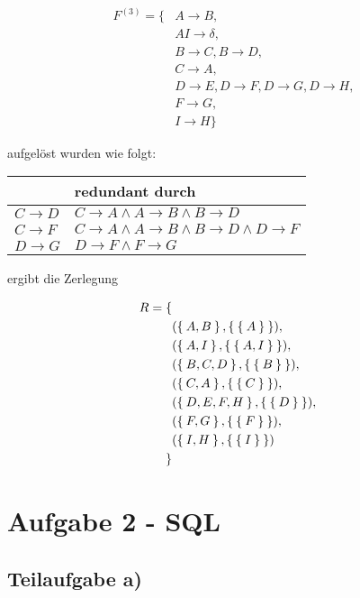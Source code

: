 \documentclass[a4paper,9pt]{scrartcl}
\begin{document}
\begin{align*}
F^{(3)} = \{  & A \rightarrow B,\\
    &AI \rightarrow \delta,\\
    & B \rightarrow C, B \rightarrow D,\\
    & C \rightarrow A,\\
    & D \rightarrow E,D \rightarrow F,D \rightarrow G,D \rightarrow H,\\
    & F \rightarrow G,\\
    & I \rightarrow H 
\}
\end{align*}

aufgelöst wurden wie folgt:

  \begin{tabular}{l|l}
             & redundant durch\\
    \hline
    $C \rightarrow D$ & $C \rightarrow A \land A \rightarrow B \land B \rightarrow D$\\
    $C \rightarrow F$ & $C \rightarrow A \land A \rightarrow B \land B \rightarrow D \land D \rightarrow F$\\
    $D \rightarrow G$ & $D \rightarrow F \land F \rightarrow G$\\
  \end{tabular}

ergibt die Zerlegung 

\begin{align*}
    R = \{\\
            & (\Set{A, B}, \Set{\Set{A}}),\\
            &(\Set{A, I}, \Set{\Set{A, I}}),\\
            & (\Set{B, C, D}, \Set{\Set{B}}),\\
            & (\Set{C, A}, \Set{\Set{C}}),\\
            & (\Set{D, E, F, H},\Set{\Set{D}}),\\
            & (\Set{F, G}, \Set{\Set{F}}),\\
            & (\Set{I, H}, \Set{\Set{I}})\\
        \}
\end{align*}
\clearpage

\section{Aufgabe 2 - SQL}
\subsection{Teilaufgabe a)}
\end{document}
